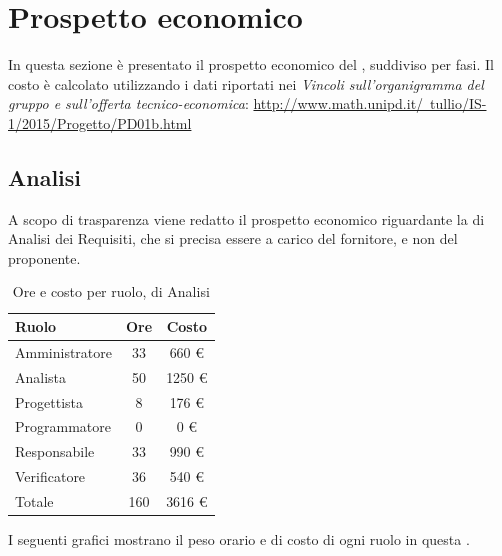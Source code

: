 \section{Prospetto economico}
In questa sezione è presentato il prospetto economico del  , suddiviso per fasi. Il costo è calcolato utilizzando i dati
riportati nei \textit{Vincoli sull’organigramma del gruppo e sull’offerta tecnico-economica}:
\href{http://www.math.unipd.it/~tullio/IS-1/2015/Progetto/PD01b.html}{http://www.math.unipd.it/~tullio/IS-1/2015/Progetto/PD01b.html}


\subsection{Analisi}
A scopo di trasparenza viene redatto il prospetto economico riguardante la  di Analisi dei Requisiti, che si precisa essere a carico del fornitore, e non del proponente.

\begin{table}[H]
	\centering
	\begin{tabular}{ l c c }
		\textbf{Ruolo} & \textbf{Ore} & \textbf{Costo} \\
		\hline
		Amministratore & 33 & 660 \euro{} \\
		Analista & 50 & 1250 \euro{} \\
		Progettista & 8 & 176 \euro{} \\
		Programmatore & 0 & 0 \euro{} \\
		Responsabile & 33 & 990 \euro{} \\
		Verificatore & 36 & 540 \euro{} \\
		\hline
		Totale & 160 & 3616 \euro{} \\
		\hline
	\end{tabular}
	\caption{Ore e costo per ruolo,  di Analisi}
\end{table}

I seguenti grafici mostrano il peso orario e di costo di ogni ruolo in questa .

